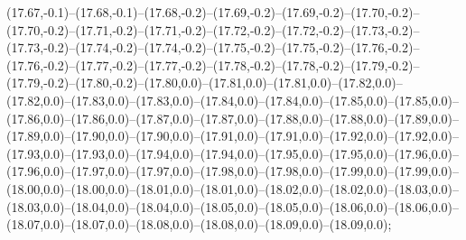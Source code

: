(17.67,-0.1)--(17.68,-0.1)--(17.68,-0.2)--(17.69,-0.2)--(17.69,-0.2)--(17.70,-0.2)--(17.70,-0.2)--(17.71,-0.2)--(17.71,-0.2)--(17.72,-0.2)--(17.72,-0.2)--(17.73,-0.2)--(17.73,-0.2)--(17.74,-0.2)--(17.74,-0.2)--(17.75,-0.2)--(17.75,-0.2)--(17.76,-0.2)--(17.76,-0.2)--(17.77,-0.2)--(17.77,-0.2)--(17.78,-0.2)--(17.78,-0.2)--(17.79,-0.2)--(17.79,-0.2)--(17.80,-0.2)--(17.80,0.0)--(17.81,0.0)--(17.81,0.0)--(17.82,0.0)--(17.82,0.0)--(17.83,0.0)--(17.83,0.0)--(17.84,0.0)--(17.84,0.0)--(17.85,0.0)--(17.85,0.0)--(17.86,0.0)--(17.86,0.0)--(17.87,0.0)--(17.87,0.0)--(17.88,0.0)--(17.88,0.0)--(17.89,0.0)--(17.89,0.0)--(17.90,0.0)--(17.90,0.0)--(17.91,0.0)--(17.91,0.0)--(17.92,0.0)--(17.92,0.0)--(17.93,0.0)--(17.93,0.0)--(17.94,0.0)--(17.94,0.0)--(17.95,0.0)--(17.95,0.0)--(17.96,0.0)--(17.96,0.0)--(17.97,0.0)--(17.97,0.0)--(17.98,0.0)--(17.98,0.0)--(17.99,0.0)--(17.99,0.0)--(18.00,0.0)--(18.00,0.0)--(18.01,0.0)--(18.01,0.0)--(18.02,0.0)--(18.02,0.0)--(18.03,0.0)--(18.03,0.0)--(18.04,0.0)--(18.04,0.0)--(18.05,0.0)--(18.05,0.0)--(18.06,0.0)--(18.06,0.0)--(18.07,0.0)--(18.07,0.0)--(18.08,0.0)--(18.08,0.0)--(18.09,0.0)--(18.09,0.0);